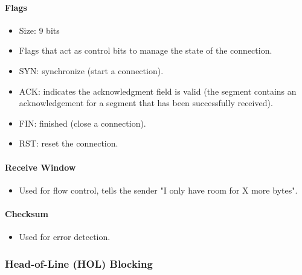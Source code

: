 \documentclass{article}
\begin{document}
\paragraph{Flags}

\begin{itemize}
    \item Size: 9 bits
    \item Flags that act as control bits to manage the state of the connection.
    \item SYN: synchronize (start a connection).
    \item ACK: indicates the acknowledgment field is valid (the segment contains an acknowledgement for a segment that has been successfully received).
    \item FIN: finished (close a connection).
    \item RST: reset the connection.
\end{itemize}

\paragraph{Receive Window}

\begin{itemize}
    \item Used for flow control, tells the sender "I only have room for X more bytes".
\end{itemize}

\paragraph{Checksum}

\begin{itemize}
    \item Used for error detection.
\end{itemize}


\subsubsection{Head-of-Line (HOL) Blocking }
\end{document}
